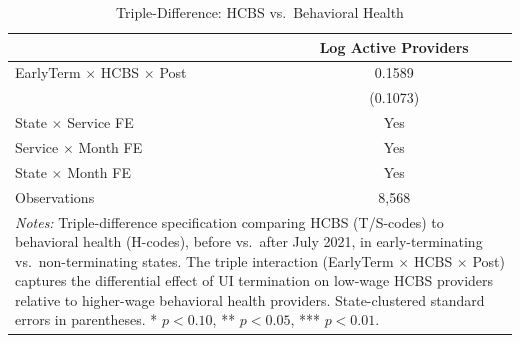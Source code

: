 \begin{table}[htbp]
\centering
\caption{Triple-Difference: HCBS vs.\ Behavioral Health}
\label{tab:triple_diff}
\begin{tabular}{lc}
\hline\hline
 & Log Active Providers \\
\hline
EarlyTerm $\times$ HCBS $\times$ Post & 0.1589 \\
 & (0.1073) \\
\hline
State $\times$ Service FE & Yes \\
Service $\times$ Month FE & Yes \\
State $\times$ Month FE & Yes \\
Observations & 8,568 \\
\hline\hline
\multicolumn{2}{p{10cm}}{\footnotesize \textit{Notes:} Triple-difference specification comparing HCBS (T/S-codes) to behavioral health (H-codes), before vs.\ after July 2021, in early-terminating vs.\ non-terminating states. The triple interaction (EarlyTerm $\times$ HCBS $\times$ Post) captures the differential effect of UI termination on low-wage HCBS providers relative to higher-wage behavioral health providers. State-clustered standard errors in parentheses. * $p<0.10$, ** $p<0.05$, *** $p<0.01$.} \\
\end{tabular}
\end{table}

